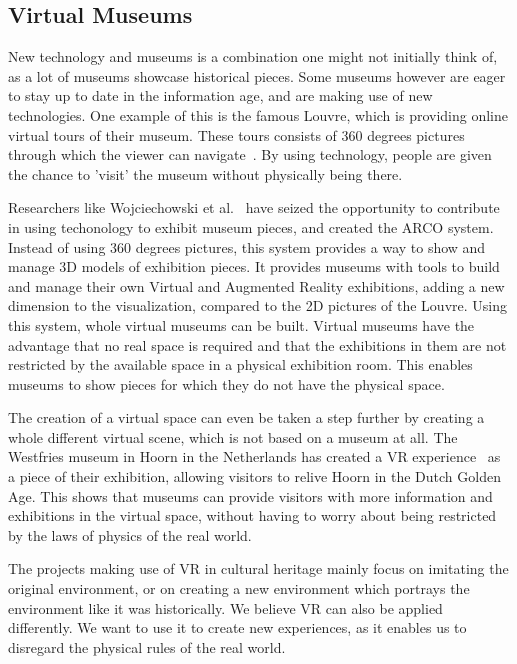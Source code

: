 \documentclass[a4paper]{article}
\begin{document}
\subsection{Virtual Museums} %
New technology and museums is a combination one might not initially think of, as a lot of museums showcase historical pieces. Some museums however are eager to stay up to date in the information age, and are making use of new technologies. One example of this is the famous Louvre, which is providing online virtual tours of their museum. These tours consists of 360 degrees pictures through which the viewer can navigate~\cite{louvre}. By using technology, people are given the chance to 'visit' the museum without physically being there. 

Researchers like Wojciechowski et al.~\cite{wojciechowski} have seized the opportunity to contribute in using techonology to exhibit museum pieces, and created the ARCO system. Instead of using 360 degrees pictures, this system provides a way to show and manage 3D models of exhibition pieces. It provides museums with tools to build and manage their own Virtual and Augmented Reality exhibitions, adding a new dimension to the visualization, compared to the 2D pictures of the Louvre. Using this system, whole virtual museums can be built. Virtual museums have the advantage that no real space is required and that the exhibitions in them are not restricted by the available space in a physical exhibition room. This enables museums to show pieces for which they do not have the physical space. 

The creation of a virtual space can even be taken a step further by creating a whole different virtual scene, which is not based on a museum at all. The Westfries museum in Hoorn in the Netherlands has created a VR experience~\cite{westfries} as a piece of their exhibition, allowing visitors to relive Hoorn in the Dutch Golden Age. This shows that museums can provide visitors with more information and exhibitions in the virtual space, without having to worry about being restricted by the laws of physics of the real world. 

The projects making use of VR in cultural heritage mainly focus on imitating the original environment, or on creating a new environment which portrays the environment like it was historically. We believe VR can also be applied differently. We want to use it to create new experiences, as it enables us to disregard the physical rules of the real world.
\end{document}
